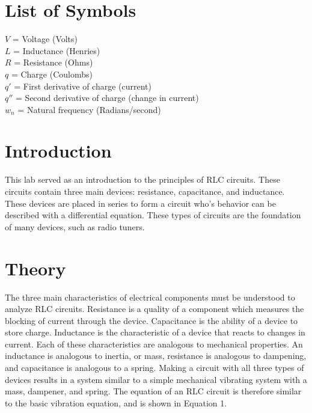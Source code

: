 \documentclass[12pt]{article}
\begin{document}

\tableofcontents

\listoffigures

\bigskip


\section*{\fontsize{12}{12}\selectfont \large List of Symbols}
$V$ = Voltage (Volts)\\
$L$ = Inductance (Henries)\\
$R$ = Resistance (Ohms)\\
$q$ = Charge (Coulombs)\\
$q'$ = First derivative of charge (current)\\
$q''$ = Second derivative of charge (change in current)\\
$w_{n}$ = Natural frequency (Radians/second)\\

\newpage



\section*{\fontsize{12}{12}\selectfont \large Introduction}
This lab served as an introduction to the principles of RLC circuits. These circuits contain three main devices: resistance, capacitance, and inductance. These devices are placed in series to form a circuit who's behavior can be described with a differential equation. These types of circuits are the foundation of many devices, such as radio tuners. 



\section*{\fontsize{12}{12}\selectfont \large Theory}
The three main characteristics of electrical components must be understood to analyze RLC circuits. Resistance is a quality of a component which measures the blocking of current through the device. Capacitance is the ability of a device to store charge. Inductance is the characteristic of a device that reacts to changes in current. Each of these characteristics are analogous to mechanical properties. An inductance is analogous to inertia, or mass, resistance is analogous to dampening, and capacitance is analogous to a spring. Making a circuit with all three types of devices results in a system similar to a simple mechanical vibrating system with a mass, dampener, and spring. The equation of an RLC circuit is therefore similar to the basic vibration equation, and is shown in Equation 1.
\bigskip
\end{document}
